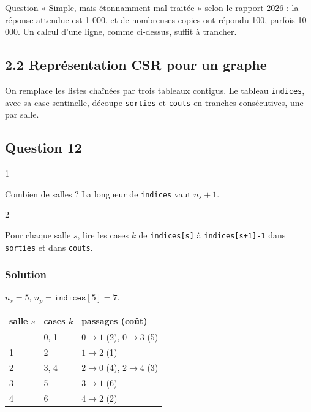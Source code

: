 \documentclass[11pt,a4paper]{article}
\begin{document}
\begin{jury}

Question « Simple, mais étonnamment mal traitée » selon le rapport 2026 : la réponse attendue est 1 000, et de nombreuses copies ont répondu 100, parfois 10 000. Un calcul d'une ligne, comme ci-dessus, suffit à trancher.

\end{jury}

\hypertarget{repruxe9sentation-csr-pour-un-graphe}{%
\subsection{2.2 Représentation CSR pour un graphe}\label{repruxe9sentation-csr-pour-un-graphe}}

On remplace les listes chaînées par trois tableaux contigus. Le tableau \texttt{indices}, avec sa case sentinelle, découpe \texttt{sorties} et \texttt{couts} en tranches consécutives, une par salle.

\hypertarget{question-12}{%
\subsection{Question 12}\label{question-12}}

\begin{indication}{1}

Combien de salles ? La longueur de \texttt{indices} vaut \(n_s + 1\).

\end{indication}

\begin{indication}{2}

Pour chaque salle \(s\), lire les cases \(k\) de \texttt{indices{[}s{]}} à \texttt{indices{[}s+1{]}-1} dans \texttt{sorties} et dans \texttt{couts}.

\end{indication}

\hypertarget{solution-11}{%
\subsubsection{Solution}\label{solution-11}}

\(n_s = 5\), \(n_p = \texttt{indices}[5] = 7\).

\begin{longtable}[]{@{}lll@{}}
\toprule\noalign{}
salle \(s\) & cases \(k\) & passages (coût) \\
\midrule\noalign{}
\endhead
\bottomrule\noalign{}
\endlastfoot
0 & 0, 1 & \(0 \to 1\) (2), \(0 \to 3\) (5) \\
1 & 2 & \(1 \to 2\) (1) \\
2 & 3, 4 & \(2 \to 0\) (4), \(2 \to 4\) (3) \\
3 & 5 & \(3 \to 1\) (6) \\
4 & 6 & \(4 \to 2\) (2) \\
\end{longtable}
\end{document}
